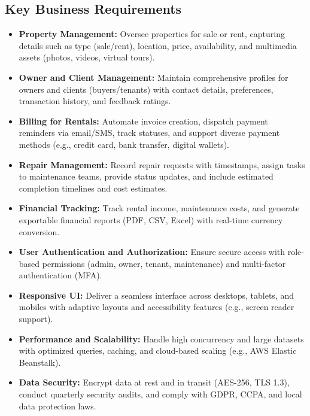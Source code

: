 \documentclass[12pt]{article}
\begin{document}
\subsection{Key Business Requirements}
\begin{itemize}
    \item \textbf{Property Management:} Oversee properties for sale or rent, capturing details such as type (sale/rent), location, price, availability, and multimedia assets (photos, videos, virtual tours).
    \item \textbf{Owner and Client Management:} Maintain comprehensive profiles for owners and clients (buyers/tenants) with contact details, preferences, transaction history, and feedback ratings.
    \item \textbf{Billing for Rentals:} Automate invoice creation, dispatch payment reminders via email/SMS, track statuses, and support diverse payment methods (e.g., credit card, bank transfer, digital wallets).
    \item \textbf{Repair Management:} Record repair requests with timestamps, assign tasks to maintenance teams, provide status updates, and include estimated completion timelines and cost estimates.
    \item \textbf{Financial Tracking:} Track rental income, maintenance costs, and generate exportable financial reports (PDF, CSV, Excel) with real-time currency conversion.
    \item \textbf{User Authentication and Authorization:} Ensure secure access with role-based permissions (admin, owner, tenant, maintenance) and multi-factor authentication (MFA).
    \item \textbf{Responsive UI:} Deliver a seamless interface across desktops, tablets, and mobiles with adaptive layouts and accessibility features (e.g., screen reader support).
    \item \textbf{Performance and Scalability:} Handle high concurrency and large datasets with optimized queries, caching, and cloud-based scaling (e.g., AWS Elastic Beanstalk).
    \item \textbf{Data Security:} Encrypt data at rest and in transit (AES-256, TLS 1.3), conduct quarterly security audits, and comply with GDPR, CCPA, and local data protection laws.
\end{itemize}
\end{document}

